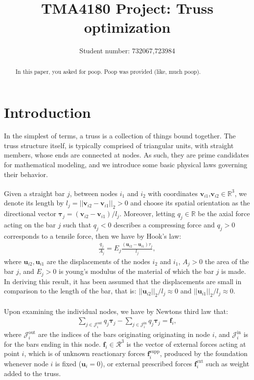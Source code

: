 \documentclass[10pt,a4paper]{article}
\begin{document}
\title{TMA4180 Project: Truss optimization}
\author{Student number: 732067,723984}
\maketitle
\begin{abstract}
\noindent
In this paper, you asked for poop. Poop was provided (like, much poop).
\end{abstract}
\section{Introduction}
In the simplest of terms, a truss is a collection of things bound together. The truss structure itself, is typically comprised of triangular units, with straight members, whose ends are connected at nodes. As such, they are prime candidates for mathematical modeling, and we introduce some basic physical laws governing their behavior.
\\\\
Given a straight bar $j$, between nodes $i_1$ and $i_2$ with coordinates $\boldsymbol{v}_{i1}$,$\boldsymbol{v}_{i2}\in\mathbb{R}^3$, we denote its length by $l_j = ||\boldsymbol{v}_{i2} - \boldsymbol{v}_{i1}||_{2} > 0$ and choose its spatial orientation as the directional vector $\boldsymbol{\tau}_j = (\boldsymbol{v}_{i2}-\boldsymbol{v}_{i1})/l_j$. Moreover, letting $q_j\in\mathbb{R}$ be the axial force acting on the bar $j$ such that $q_j < 0$ describes a compressing force and $q_j > 0$ corresponds to a tensile force, then we have by Hook's law:
\begin{align}
\frac{q_j}{A_j} = E_j\frac{(\boldsymbol{u}_{i2}-\boldsymbol{u}_{i1})\tau_j}{l_j} \label{eq: 1},
\end{align}
where $\boldsymbol{u}_{i2},\boldsymbol{u}_{i1}$ are the displacements of the nodes $i_2$ and $i_1$, $A_j>0$ the area of the bar $j$, and $E_j>0$ is young's modulus of the material of which the bar $j$ is made. In deriving this result, it has been assumed that the displacements are small in comparison to the length of the bar, that is: $||\boldsymbol{u}_{i2}||_2/l_j \approx 0$ and $||\boldsymbol{u}_{i1}||_2/l_j \approx 0$.
\\\\
Upon examining the individual nodes, we have by Newtons third law that:
\begin{align}
\sum_{j\in\mathcal{J}_i^{\text{out}}}q_j\boldsymbol{\tau}_j-\sum_{j\in\mathcal{J}_i^{\text{in}}}q_j\boldsymbol{\tau}_j = \boldsymbol{f}_i \label{eq: 2},
\end{align}
where $\mathcal{J}_i^{\text{out}}$ are the indices of the bars originating originating in node $i$, and $\mathcal{J}_i^{\text{in}}$ is for the bars ending in this node. $\boldsymbol{f}_i\in\mathcal{R}^3$ is the vector of external forces acting at point $i$, which is of unknown reactionary forces $\boldsymbol{f}_i^{\text{supp}}$, produced by the foundation whenever node $i$ is fixed ($\boldsymbol{u}_i = 0$), or external prescribed forces $\boldsymbol{f}_i^{\text{ext}}$ such as weight added to the truss.
\newpage
\end{document}
